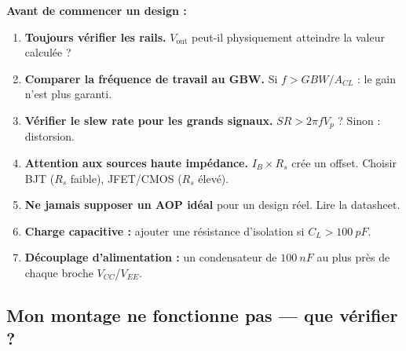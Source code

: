 \documentclass[12pt,a4paper,twoside]{book}
\begin{document}
\begin{pratique}
\textbf{Avant de commencer un design :}
\begin{enumerate}[nosep]
\item \textbf{Toujours vérifier les rails.} $V_{\text{out}}$ peut-il physiquement atteindre la valeur calculée ?
\item \textbf{Comparer la fréquence de travail au GBW.} Si $f > GBW/A_{CL}$ : le gain n'est plus garanti.
\item \textbf{Vérifier le slew rate pour les grands signaux.} $SR > 2\pi f V_p$ ? Sinon : distorsion.
\item \textbf{Attention aux sources haute impédance.} $I_B \times R_s$ crée un offset. Choisir BJT ($R_s$ faible), JFET/CMOS ($R_s$ élevé).
\item \textbf{Ne jamais supposer un AOP idéal} pour un design réel. Lire la datasheet.
\item \textbf{Charge capacitive :} ajouter une résistance d'isolation si $C_L > \SI{100}{pF}$.
\item \textbf{Découplage d'alimentation :} un condensateur de $\SI{100}{nF}$ au plus près de chaque broche $V_{CC}$/$V_{EE}$.
\end{enumerate}
\end{pratique}

\subsection{Mon montage ne fonctionne pas --- que vérifier ?}
\end{document}
